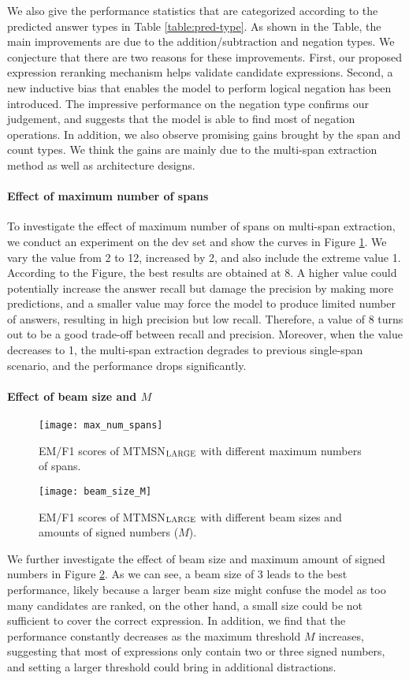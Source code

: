 \documentclass[11pt,a4paper]{article}
\newcommand\mtmsnlarge{MTMSN$_{\textsc{LARGE}}$\xspace}
\begin{document}
We also give the performance statistics that are categorized according to the predicted answer types in Table \ref{table:pred-type}. 
As shown in the Table, the main improvements are due to the addition/subtraction and negation types.
We conjecture that there are two reasons for these improvements.
First, our proposed expression reranking mechanism helps validate candidate expressions.
Second, a new inductive bias that enables the model to perform logical negation has been introduced.
The impressive performance on the negation type confirms our judgement, and suggests that the model is able to find most of negation operations.
In addition, we also observe promising gains brought by the span and count types. 
We think the gains are mainly due to the multi-span extraction method as well as architecture designs.

\paragraph{Effect of maximum number of spans}
To investigate the effect of maximum number of spans on multi-span extraction, we conduct an experiment on the dev set and show the curves in Figure \ref{fig:max_num_spans}.
We vary the value from 2 to 12, increased by 2, and also include the extreme value 1.
According to the Figure, the best results are obtained at 8. 
A higher value could potentially increase the answer recall but damage the precision by making more predictions, and a smaller value may force the model to produce limited number of answers, resulting in high precision but low recall.
Therefore, a value of 8 turns out to be a good trade-off between recall and precision.
Moreover, when the value decreases to 1, the multi-span extraction degrades to previous single-span scenario, and the performance drops significantly.

\paragraph{Effect of beam size and $M$}
\begin{figure}
	\center
	\texttt{[image: max\_num\_spans]}
	\caption{EM/F1 scores of \mtmsnlarge with different maximum numbers of spans.}
	\label{fig:max_num_spans}
\end{figure}

\begin{figure}
	\center
	\texttt{[image: beam\_size\_M]}
	\caption{EM/F1 scores of \mtmsnlarge with different beam sizes and amounts of signed numbers ($M$).}
	\label{fig:beam_size_M}
\end{figure}
We further investigate the effect of beam size and maximum amount of signed numbers in Figure \ref{fig:beam_size_M}. 
As we can see, a beam size of 3 leads to the best performance, likely because a larger beam size might confuse the model as too many candidates are ranked, on the other hand, a small size could be not sufficient to cover the correct expression.
In addition, we find that the performance constantly decreases as the maximum threshold $M$ increases, suggesting that most of expressions only contain two or three signed numbers, and setting a larger threshold could bring in additional distractions.
\end{document}
